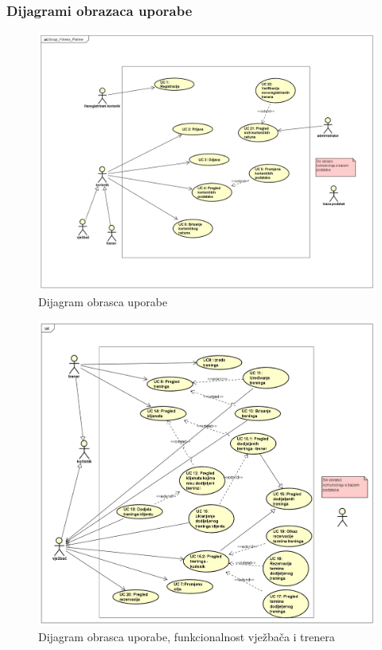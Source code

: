 				\subsubsection{Dijagrami obrazaca uporabe}
					
					\begin{figure}[H]
                      \includegraphics[scale=0.4]{./Dijagrami/UC0_Group_Fitness_Planner.png}
                      \centering
                      \caption{Dijagram obrasca uporabe}
                      \label{fig:promjene}
                \end{figure}
                \begin{figure}[H]
                      \includegraphics[scale=0.4]{./Dijagrami/UC1_Uloge.png}
                      \centering
                      \caption{Dijagram obrasca uporabe, funkcionalnost vježbača i trenera}
                      \label{fig:promjene}
                \end{figure}
                
